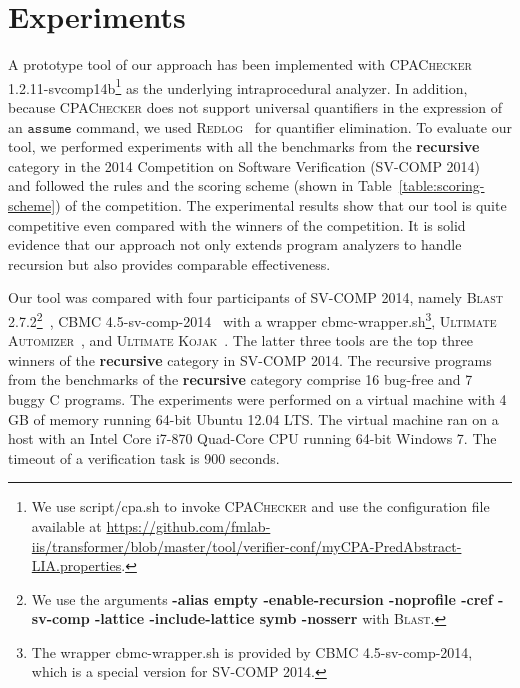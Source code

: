 
\newcommand{\safe}{S}
\newcommand{\unsafe}{U}
\newcommand{\unknown}{?}
\newcommand{\exception}{E}
\newcommand{\timeout}{T.O.}
\newcommand{\unknownmark}{\ensuremath{^?}}
\newcommand{\wrongmark}{\ensuremath{^!}}

\chapter{Experiments}\label{ch:experiments}

A prototype tool of our approach has been implemented with
\textsc{CPAChecker} 1.2.11-svcomp14b\footnote{We use script/cpa.sh to
  invoke \textsc{CPAChecker} and use the configuration file
  available at \url{https://github.com/fmlab-iis/transformer/blob/master/tool/verifier-conf/myCPA-PredAbstract-LIA.properties}.} as the underlying
intraprocedural analyzer.
In addition, because \textsc{CPAChecker} does not support universal quantifiers in the expression of an $\mathtt{assume}$ command, we used \textsc{Redlog}~\cite{redlog} for quantifier elimination.
To evaluate our tool, we performed experiments with all the benchmarks
from the \textbf{recursive} category in the 2014 Competition on
Software Verification (SV-COMP 2014)~\cite{svcomp14} and followed the
rules and the scoring scheme (shown in Table~\ref{table:scoring-scheme})
of the competition.
The experimental results show that our tool is quite competitive even
compared with the winners of the competition.
It is solid evidence that our approach not only extends program
analyzers to handle recursion but also provides comparable
effectiveness.

Our tool was compared with four participants of
SV-COMP 2014, namely \textsc{Blast} 2.7.2\footnote{We use the
  arguments \textbf{-alias empty -enable-recursion -noprofile -cref
    -sv-comp -lattice -include-lattice symb -nosserr} with
  \textsc{Blast}.}~\cite{BeyerHJM07},
CBMC 4.5-sv-comp-2014~\cite{ClarkeKL04} with a wrapper
cbmc-wrapper.sh\footnote{The wrapper cbmc-wrapper.sh is provided by
  CBMC 4.5-sv-comp-2014, which is a special version for SV-COMP
  2014.}, \textsc{Ultimate Automizer}~\cite{HeizmannCDEHLNSP13}, and \textsc{Ultimate
Kojak}~\cite{ErmisNDHP14}.
The latter three tools are the top three winners of the
\textbf{recursive} category in SV-COMP 2014.
The recursive programs from the benchmarks of the \textbf{recursive}
category comprise 16 bug-free and 7 buggy C programs.
The experiments were performed on a virtual machine with 4 GB of memory
running 64-bit Ubuntu 12.04 LTS. 
The virtual machine ran on a host with an Intel Core i7-870 Quad-Core
CPU running 64-bit Windows 7.
The timeout of a verification task is 900 seconds.


